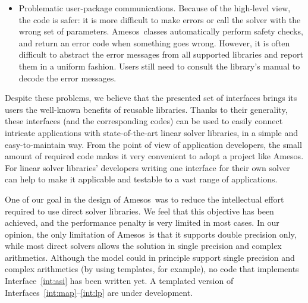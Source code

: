 \documentclass[acmtocl]{acmtrans2m}
\newcommand{\amesos}{{\sc Amesos}}
\begin{document}
\begin{itemize}
\item
Problematic user-package communications. Because of the high-level view, the
code is safer: it is more difficult to make errors or call the solver with the
wrong set of parameters. \amesos\ classes automatically perform safety checks,
      and return an error code when something goes wrong. However,
it is often difficult to abstract the error
messages from all supported libraries and report them in a uniform fashion.
Users still need to consult the library's manual to decode the error messages.
\end{itemize}

%

Despite these problems, we believe that the presented set of interfaces
brings its users the well-known benefits of reusable libraries. Thanks to
their generality, these interfaces (and the corresponding codes) can be used to
easily connect intricate applications with state-of-the-art linear solver
libraries, in a simple and easy-to-maintain way. From the point of view of
application developers, the small amount of required code makes it very
convenient to adopt a project like \amesos. For linear solver
libraries' developers  writing one interface for their own solver can help to make it
applicable and testable to a vast range of applications.

One of our goal in the design of \amesos\ was to reduce the intellectual
effort required to use direct solver libraries. We feel that this objective
has been achieved, and the performance penalty is very limited in most cases.
In our opinion, the only limitation of \amesos\ is that it supports double
precision only, while most direct solvers allows the solution in single
precision and complex arithmetics.  Although the model could in principle
support single precision and complex arithmetics (by using templates, for
                                                  example), no code that
implements Interface~\ref{int:asi} has been written yet. A templated version
of Interfaces~\ref{int:map}--\ref{int:lp} are under development.
\end{document}
